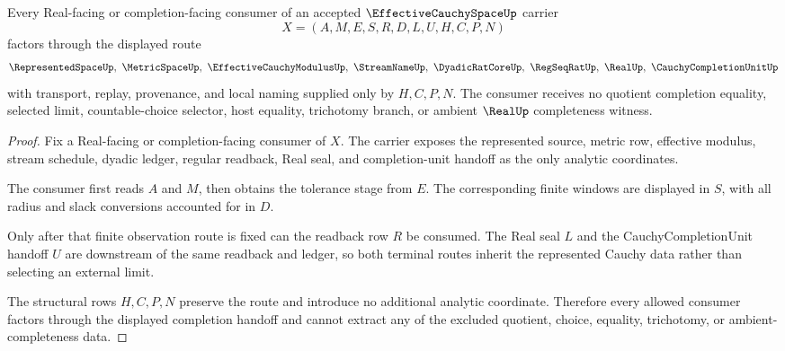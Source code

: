 \begin{theorem}\label{thm:effective-cauchy-space-completion-handoff}
Every Real-facing or completion-facing consumer of an accepted $\EffectiveCauchySpaceUp$ carrier
$$
X=(A,M,E,S,R,D,L,U,H,C,P,N)
$$
factors through the displayed route
$$
\RepresentedSpaceUp,\ \MetricSpaceUp,\ \EffectiveCauchyModulusUp,\ \StreamNameUp,\ \DyadicRatCoreUp,\ \RegSeqRatUp,\ \RealUp,\ \CauchyCompletionUnitUp
$$
with transport, replay, provenance, and local naming supplied only by $H,C,P,N$. The consumer receives no quotient completion equality, selected limit, countable-choice selector, host equality, trichotomy branch, or ambient $\RealUp$ completeness witness.
\end{theorem}
\begin{proof}
Fix a Real-facing or completion-facing consumer of $X$. The carrier exposes the represented source, metric row, effective modulus, stream schedule, dyadic ledger, regular readback, Real seal, and completion-unit handoff as the only analytic coordinates.

The consumer first reads $A$ and $M$, then obtains the tolerance stage from $E$. The corresponding finite windows are displayed in $S$, with all radius and slack conversions accounted for in $D$.

Only after that finite observation route is fixed can the readback row $R$ be consumed. The Real seal $L$ and the CauchyCompletionUnit handoff $U$ are downstream of the same readback and ledger, so both terminal routes inherit the represented Cauchy data rather than selecting an external limit.

The structural rows $H,C,P,N$ preserve the route and introduce no additional analytic coordinate. Therefore every allowed consumer factors through the displayed completion handoff and cannot extract any of the excluded quotient, choice, equality, trichotomy, or ambient-completeness data.
\end{proof}



